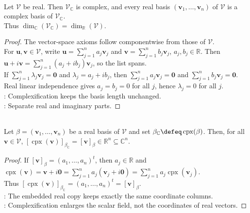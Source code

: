 \begin{proposition} \label{prop:complexification-vector-space-basis} \\
Let $\mathcal{V}$ be real. Then $\mathcal{V}_{\mathbb{C}}$ is complex, and every real basis $(\mathbf{v}_1,\ldots,\mathbf{v}_n)$ of $\mathcal{V}$ is a complex basis of $\mathcal{V}_{\mathbb{C}}$.\\
Thus $\dim_{\mathbb{C}}(\mathcal{V}_{\mathbb{C}})=\dim_{\mathbb{R}}(\mathcal{V})$.
\begin{proof}
The vector-space axioms follow componentwise from those of $\mathcal{V}$.\\
For $\mathbf{u},\mathbf{v}\in\mathcal{V}$, write $\mathbf{u}=\sum\limits_{j=1}^{n}a_j\mathbf{v}_j$ and $\mathbf{v}=\sum\limits_{j=1}^{n}b_j\mathbf{v}_j$, $a_j,b_j\in\mathbb{R}$. Then $\mathbf{u}+i\mathbf{v}=\sum\limits_{j=1}^{n}(a_j+ib_j)\mathbf{v}_j$, so the list spans.\\
If $\sum\limits_{j=1}^{n}\lambda_j\mathbf{v}_j=\mathbf{0}$ and $\lambda_j=a_j+ib_j$, then $\sum\limits_{j=1}^{n}a_j\mathbf{v}_j=\mathbf{0}$ and $\sum\limits_{j=1}^{n}b_j\mathbf{v}_j=\mathbf{0}$.\\
Real linear independence gives $a_j=b_j=0$ for all $j$, hence $\lambda_j=0$ for all $j$.\\
: Complexification keeps the basis length unchanged.\\
: Separate real and imaginary parts.
\end{proof}
\end{proposition}

\begin{corollary} \label{cor:complexification-coordinate-compatibility} \\
Let $\beta=(\mathbf{v}_1,\ldots,\mathbf{v}_n)$ be a real basis of $\mathcal{V}$ and set $\beta_{\mathbb{C}}\defeq\operatorname{cpx}(\beta)$. Then, for all $\mathbf{v}\in\mathcal{V}$, $[\operatorname{cpx}(\mathbf{v})]_{\beta_{\mathbb{C}}}=[\mathbf{v}]_{\beta}\in\mathbb{R}^n\subseteq\mathbb{C}^n$.
\begin{proof}
If $[\mathbf{v}]_{\beta}=(a_1,\ldots,a_n)^t$, then $a_j\in\mathbb{R}$ and $\operatorname{cpx}(\mathbf{v})=\mathbf{v}+i\mathbf{0} =\sum\limits_{j=1}^{n}a_j(\mathbf{v}_j+i\mathbf{0}) =\sum\limits_{j=1}^{n}a_j\operatorname{cpx}(\mathbf{v}_j)$.\\
Thus $[\operatorname{cpx}(\mathbf{v})]_{\beta_{\mathbb{C}}}=(a_1,\ldots,a_n)^t=[\mathbf{v}]_{\beta}$.\\
: The embedded real copy keeps exactly the same coordinate columns.\\
: Complexification enlarges the scalar field, not the coordinates of real vectors.
\end{proof}
\end{corollary}

